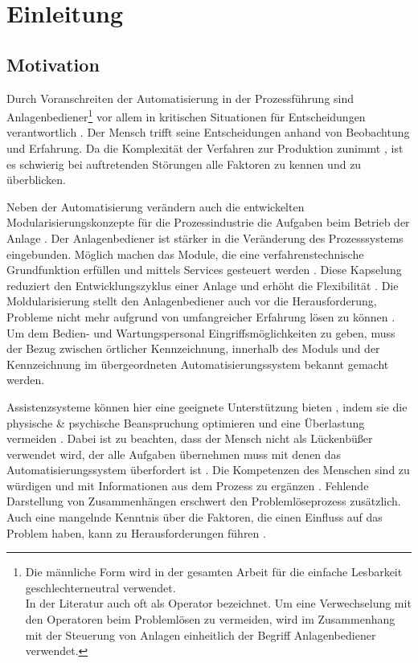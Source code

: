 
\chapter{Einleitung}
\label{sec:Einleitung}
\section{Motivation}
Durch Voranschreiten der Automatisierung in der Prozessführung sind Anlagenbediener\footnote{Die männliche Form wird in der gesamten Arbeit für die einfache Lesbarkeit geschlechterneutral verwendet. \\ In der Literatur auch oft als Operator bezeichnet. Um eine Verwechselung mit den Operatoren beim Problemlösen zu vermeiden, wird im Zusammenhang mit der Steuerung von Anlagen einheitlich der Begriff Anlagenbediener verwendet.} vor allem in kritischen Situationen für Entscheidungen verantwortlich \cite{Bainbridge1983}. Der Mensch trifft seine Entscheidungen anhand von Beobachtung und Erfahrung. Da die Komplexität der Verfahren zur Produktion zunimmt \cite{Poetter2007}, ist es schwierig bei auftretenden Störungen alle Faktoren zu kennen und zu überblicken. 

Neben der Automatisierung verändern auch die entwickelten Modularisierungskonzepte für die Prozessindustrie die Aufgaben beim Betrieb der Anlage \cite{Muller2017}. Der Anlagenbediener ist stärker in die Veränderung des Prozesssystems eingebunden. Möglich machen das Module, die eine verfahrenstechnische Grundfunktion erfüllen und mittels Services gesteuert werden \cite{Bloch2017}. Diese Kapselung reduziert den Entwicklungszyklus einer Anlage und erhöht die Flexibilität \cite{ZVEI2015}. Die Moldularisierung stellt den Anlagenbediener auch vor die Herausforderung, Probleme nicht mehr aufgrund von umfangreicher Erfahrung lösen zu können \cite{Muller2018}. \glqq Um dem Bedien- und Wartungspersonal Eingriffsmöglichkeiten zu geben, muss der Bezug zwischen örtlicher Kennzeichnung, innerhalb des Moduls und der Kennzeichnung im übergeordneten Automatisierungssystem bekannt gemacht werden.\grqq \ \citep[28]{Obst2013}

Assistenzsysteme können hier eine geeignete Unterstützung bieten \cite{Dalgleish2007}, indem sie die physische \& psychische Beanspruchung optimieren und eine Überlastung vermeiden \cite{Weisner2018}. Dabei ist zu beachten, dass der Mensch nicht als Lückenbüßer verwendet wird, der alle Aufgaben übernehmen muss mit denen das Automatisierungssystem überfordert ist \cite{Dalgleish2007}. Die Kompetenzen des Menschen sind zu würdigen und mit Informationen aus dem Prozess zu ergänzen \cite{Weisner2018}. Fehlende Darstellung von Zusammenhängen erschwert den Problemlöseprozess zusätzlich. Auch eine mangelnde Kenntnis über die Faktoren, die einen Einfluss auf das Problem haben, kann zu Herausforderungen führen \cite{Herczeg2003}.

